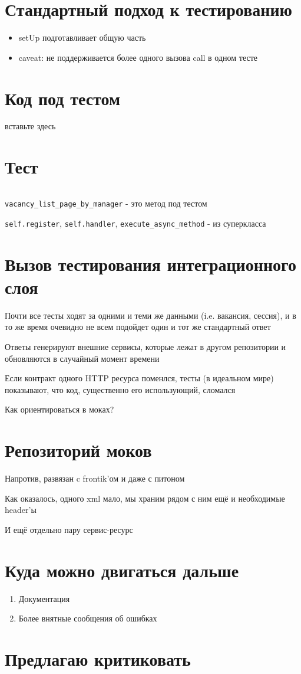 \documentclass[12pt]{article}
\begin{document}
\section{Стандартный подход к тестированию}
\begin{itemize}
\item setUp подготавливает общую часть

\item caveat: не поддерживается более одного вызова call в одном тесте
\end{itemize}

\section{Код под тестом}
\small


вставьте здесь

\section{Тест}

\small
\inputminted[linenos=true]{python}{test.py}

\verb+vacancy_list_page_by_manager+ - это метод под тестом

\verb+self.register+, \verb+self.handler+, \verb+execute_async_method+ - из суперкласса

\section{Вызов тестирования интеграционного слоя}

Почти все тесты ходят за одними и теми же данными (i.e. вакансия, сессия), и в то же время очевидно не всем подойдет один и тот же стандартный ответ

Ответы генерируют внешние сервисы, которые лежат в другом репозитории и обновляются в случайный момент времени

Если контракт одного HTTP ресурса поменлся, тесты (в идеальном мире) показывают, что код, существенно его использующий, сломался

Как ориентироваться в моках?

\section{Репозиторий моков}

Напротив, развязан c frontik'ом и даже с питоном

Как оказалось, одного xml мало, мы храним рядом с ним ещё и необходимые header'ы

И ещё отдельно пару сервис-ресурс

\section{Куда можно двигаться дальше}

\begin{enumerate}
\item Документация
\item Более внятные сообщения об ошибках
\end{enumerate}

\section{Предлагаю критиковать}
\end{document}
